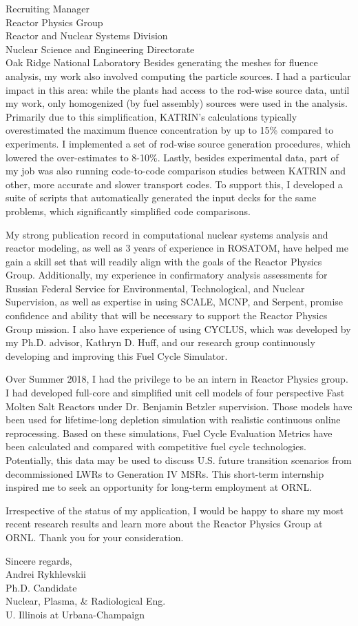 \documentclass[11pt]{letter} %
\newcommand{\RecipientName}{Recruiting Manager\xspace}
\newcommand{\RecipientAddress}{Reactor Physics Group\\ Reactor and Nuclear Systems Division\\ Nuclear Science and Engineering Directorate \\ Oak Ridge National Laboratory}
\begin{document}
\begin{letter}{\RecipientName\\
        \RecipientAddress\xspace}
Besides generating the meshes for fluence analysis, my work also involved computing the particle sources. I had a particular impact in this area: while the plants had access to the rod-wise source data, until my work, only homogenized (by fuel assembly) sources were used in the analysis. Primarily due to this simplification, KATRIN’s calculations typically overestimated the maximum fluence concentration by up to 15\% compared to experiments. I implemented a set of rod-wise source generation procedures, which lowered the over-estimates to 8-10\%. Lastly, besides experimental data, part of my job was also running code-to-code comparison studies between KATRIN and other, more accurate and slower transport codes. To support this, I developed a suite of scripts that automatically generated the input decks for the same problems, which significantly simplified code comparisons. 

My strong publication record in computational nuclear systems analysis and reactor modeling, as well as 3 years of experience in ROSATOM, have helped me gain a skill set that will readily align with the goals of the Reactor Physics Group. Additionally, my experience in confirmatory analysis assessments for 
Russian Federal Service for Environmental, Technological, and Nuclear Supervision, as well as expertise in using SCALE, MCNP, and Serpent, promise confidence and ability that will be necessary to support the Reactor Physics Group mission. I also have experience of using CYCLUS, which was developed by my Ph.D. advisor, Kathryn D. Huff, and our research group continuously developing and improving this Fuel Cycle Simulator.

Over Summer 2018, I had the privilege to be an intern in Reactor Physics group. I had developed full-core and simplified unit cell models of four perspective Fast Molten Salt Reactors under Dr. Benjamin Betzler supervision. Those models have been used for lifetime-long depletion simulation with realistic continuous online reprocessing. Based on these simulations, Fuel Cycle Evaluation Metrics have been calculated and compared with competitive fuel cycle technologies. Potentially, this data may be used to discuss U.S. future transition scenarios from decommissioned LWRs to Generation IV MSRs. This short-term internship inspired me to seek an opportunity for long-term employment at ORNL.

Irrespective of the status of my application, I would be happy to share my most recent research results and learn more about the Reactor Physics Group at ORNL. Thank you for your consideration.

\closing{Sincere regards,\\
{Andrei Rykhlevskii\\
Ph.D. Candidate\\
Nuclear, Plasma, \& Radiological Eng.\\
U. Illinois at Urbana-Champaign}
}


\end{letter}
\end{document}
